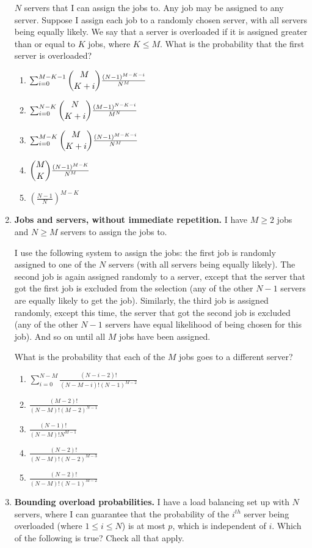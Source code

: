 \documentclass[11pt, preview]{standalone} %
\begin{document}
\begin{enumerate}
    $N$ servers that I can assign the jobs to. Any job may be assigned to any 
    server. Suppose I assign each job to a randomly chosen server, with all 
    servers being equally likely. We say that a server is overloaded if it is 
    assigned greater than or equal to $K$ jobs, where $K \leq M$. What is the 
    probability that the first server is overloaded?
\begin{Choices}
\begin{enumerate}
    \FalseChoice\item $\sum_{i=0}^{M-K-1} \dbinom{M}{K+i} \frac{(N-1)^{M-K-i}}{N^{M}}$
    \FalseChoice\item $\sum_{i=0}^{N-K} \dbinom{N}{K+i} \frac{(M-1)^{N-K-i}}{M^{N}}$
    \TrueChoice\item $\sum_{i=0}^{M-K} \dbinom{M}{K+i} \frac{(N-1)^{M-K-i}}{N^{M}}$
    \FalseChoice\item $\dbinom{M}{K} \frac{(N-1)^{M-K}}{N^{M}}$
    \FalseChoice\item $\left(\frac{N-1}{N}\right)^{M-K}$
\end{enumerate}
\end{Choices}
\item {\bf Jobs and servers, without immediate repetition.} I have $M\geq 2$ 
    jobs and $N \geq M$ servers to assign the jobs to.
    
    I use the following system to assign the jobs: the 
    first job is randomly assigned to one of the $N$ servers (with all servers 
    being equally likely). The second job is again assigned randomly to a 
    server, except that the server that got the first job is excluded from the 
    selection (any of the other $N-1$ servers are equally likely to get the job). 
    Similarly, the third job is assigned randomly, except this time, the 
    server that got the second job is excluded (any of the other $N-1$ servers 
    have equal likelihood of being chosen for this job). And so on until all 
    $M$ jobs have been assigned.

    What is the probability that each of the $M$ jobs goes to a different 
    server?
\begin{Choices}
\begin{enumerate}
    \FalseChoice\item $\sum_{i=0}^{N-M}\frac{(N-i-2)!}{(N-M-i)! (N-1)^{M-2}}$
    \FalseChoice\item $\frac{(M-2)!}{(N-M)! (M-2)^{N-1}}$
    \FalseChoice\item $\frac{(N-1)!}{(N-M)! N^{M-1}}$
    \FalseChoice\item $\frac{(N-2)!}{(N-M)! (N-2)^{M-3}}$
    \TrueChoice\item $\frac{(N-2)!}{(N-M)! (N-1)^{M-2}}$
\end{enumerate}
\end{Choices}
\item {\bf Bounding overload probabilities.} I have a load balancing set up 
    with $N$ servers, where I can guarantee that the probability of the $i^{th}$ 
    server being overloaded (where $1\leq i \leq N$) is at most $p$, which is 
    independent of $i$. Which of the following is true? Check all that apply.
    

\end{enumerate}
\end{document}
